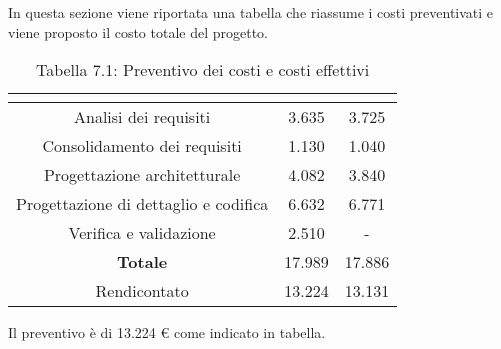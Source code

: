 In questa sezione viene riportata una tabella che riassume i costi preventivati e viene proposto il costo totale del progetto.
\\
\renewcommand{\arraystretch}{1.5}
\begin{table}[H]
\begin{center}
\begin{tabular}{|c|c|c|}
\hline
\rowcolor{title_row}
\textbf{\color{title_text}{Periodo}}  & \textbf{\color{title_text}{Preventivo \euro}} & \textbf{\color{title_text}{Consuntivo \euro}} \\ \hline
Analisi dei requisiti   & 3.635 & 3.725 \\ \hline
Consolidamento dei requisiti   & 1.130 & 1.040 \\ \hline
Progettazione architetturale    & 4.082 & 3.840 \\ \hline
Progettazione di dettaglio e codifica    & 6.632 & 6.771 \\ \hline
Verifica e validazione    & 2.510 & - \\ \hline
\textbf{Totale}   & 17.989 & 17.886 \\ \hline
Rendicontato   & 13.224 & 13.131 \\ \hline
\end{tabular}
\caption{Tabella 7.1: Preventivo dei costi e costi effettivi\label{}}
\end{center}
\end{table}
\renewcommand{\arraystretch}{1}

Il preventivo è di 13.224 \euro{} come indicato in tabella.
\newpage
